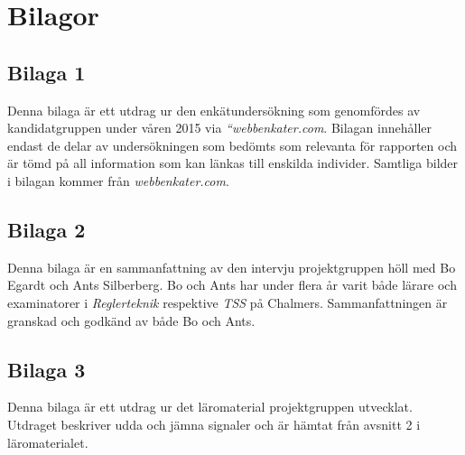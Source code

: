 \documentclass[]{article}
\begin{document}
\newpage




\newpage

\section{Bilagor}
\subsection{Bilaga 1}
Denna bilaga är ett utdrag ur den enkätundersökning som genomfördes av kandidatgruppen under våren 2015
via \textit{“webbenkater.com}. Bilagan innehåller endast de delar av undersökningen som bedömts som relevanta
för rapporten och är tömd på all information som kan länkas till enskilda individer. Samtliga bilder i bilagan
kommer från \textit{webbenkater.com}.
\newpage

\subsection{Bilaga 2}
Denna bilaga är en sammanfattning av den intervju projektgruppen höll med Bo Egardt och Ants Silberberg. Bo och Ants
har under flera år varit både lärare och examinatorer i \textit{Reglerteknik} respektive \textit{TSS} på Chalmers.
Sammanfattningen är granskad och godkänd av både Bo och Ants.
\newpage

\subsection{Bilaga 3}
Denna bilaga är ett utdrag ur det läromaterial projektgruppen utvecklat. Utdraget beskriver udda och jämna signaler och
är hämtat från avsnitt 2 i läromaterialet.
\end{document}
